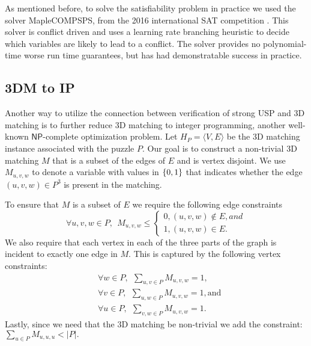 \documentclass[11pt]{article}
\renewcommand\NP{\ensuremath{\mathsf{NP}}}
\begin{document}
As mentioned before, to solve the satisfiability problem %
in
practice we used the solver MapleCOMPSPS, from the 2016
international SAT competition \cite{bhj17,lgpc16}.  This solver is
conflict driven and uses a learning rate branching heuristic to decide
which variables are likely to lead to a conflict.  The solver provides
no polynomial-time worse run time guarantees, but has had
demonstratable success in practice.

\subsection{3DM to IP}

Another way to utilize the connection between verification of strong
USP and 3D matching is to further reduce 3D matching to integer
programming, another well-known \NP{}-complete optimization problem.
Let $H_P = \langle V, E \rangle$ be the 3D matching instance
associated with the puzzle $P$.  Our goal is to construct a
non-trivial 3D matching $M$ that is a subset of the edges of $E$ and
is vertex disjoint.  We use $M_{u,v,w}$ to denote a variable with
values in $\left\{ 0,1 \right\}$ that indicates whether the edge $(u,v,w) \in
P^3$ is present in the matching.

To ensure that $M$ is a subset of $E$ we require the following edge constraints
\begin{equation}
  \forall u,v,w \in P,~~M_{u,v,w} \le \begin{cases} 0, (u,v,w) \not\in
    E, and \\ 1, (u,v,w) \in E.\end{cases} \label{eqn:cons1}
\end{equation} We also require that each vertex in
each of the three parts of the graph is incident to exactly one edge
in $M$.  This is captured by the following vertex constraints:
\begin{equation}
  \label{eqn:cons2}
\begin{aligned}
&\forall w \in P,~~\sum_{u,v \in P} M_{u,v,w} = 1,\\
&\forall v \in P,~~\sum_{u,w \in P} M_{u,v,w} = 1,\text{and} \\
&\forall u \in P,~~\sum_{v,w \in P} M_{u,v,w} = 1.
\end{aligned}
\end{equation}
Lastly, since we need that the 3D matching be non-trivial we
add the constraint:
  $\sum_{u \in P} M_{u,u,u} < |P|.$
\end{document}
